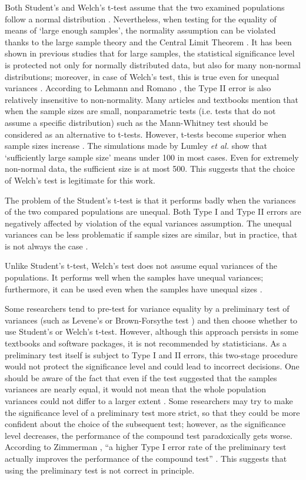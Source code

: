 Both Student's and Welch's t-test assume that the two examined populations follow a normal distribution \cite{welch}. Nevertheless, when testing for the equality of means of `large enough samples', the normality assumption can be violated thanks to the large sample theory and the Central Limit Theorem \cite{lehmann}. It has been shown in previous studies that for large samples, the statistical significance level is protected not only for normally distributed data, but also for many non-normal distributions; moreover, in case of Welch's test, this is true even for unequal variances \cite{zimmerman_zumbo_1993, zumbo_coulombe_1997, lumley}. According to  Lehmann and Romano \cite{lehmann}, the Type II error is also relatively insensitive to non-normality. Many articles and textbooks mention that when the sample sizes are small, nonparametric tests (i.e. tests that do not assume a specific distribution) such as the Mann-Whitney test \cite{mann} should be considered as an alternative to t-tests.
However, t-tests become superior when sample sizes increase \cite{zimmerman1998, lumley}. The simulations made by Lumley \textit{et al.} \cite{lumley} show that `sufficiently large sample size' means under 100 in most cases. Even for extremely non-normal data, the sufficient size is at most 500. This suggests that the choice of Welch's test is legitimate for this work.

The problem of the Student's t-test is that it performs badly when the variances of the two compared populations are unequal. Both Type I and Type II errors are negatively affected by violation of the equal variances assumption. The unequal variances can be less problematic if sample sizes are similar, but in practice, that is not always the case \cite{ruxton}.

Unlike Student's t-test, Welch's test does not assume equal variances of the populations. It performs well when the samples have unequal variances; furthermore, it can be used even when the samples have unequal sizes \cite{derrick}.

Some researchers tend to pre-test for variance equality by a preliminary test of variances (such as Levene's \cite{levene} or Brown-Forsythe test \cite{brown}) and then choose whether to use Student's or Welch's t-test. However, although this approach persists in some textbooks and software packages, it is not recommended by statisticians. As a preliminary test itself is subject to Type I and II errors, this two-stage procedure would not protect the significance level and could lead to incorrect decisions. One should be aware of the fact that even if the test suggested that the samples variances are nearly equal, it would not mean that the whole population variances could not differ to a larger extent \cite{zimmerman}. Some researchers may try to make the significance level of a preliminary test more strict, so that they could be more confident about the choice of the subsequent test; however, as the significance level decreases, the performance of the compound test paradoxically gets worse. According to Zimmerman \cite{zimmerman}, ``a higher Type I error rate of the preliminary test actually improves the performance of the compound test'' \cite{zimmerman}. This suggests that using the preliminary test is not correct in principle.

